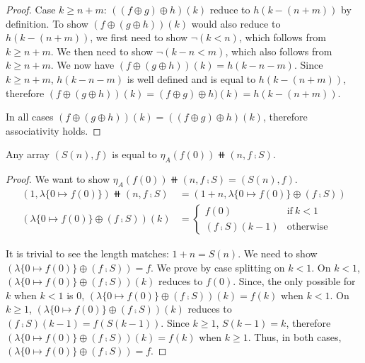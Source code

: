 \begin{proof}
    Case $k \geq n + m$: $((f \oplus g) \oplus h)(k)$ reduce to $h(k - (n + m))$ by definition.
    To show $(f \oplus (g \oplus h))(k)$ would also reduce to $h(k - (n + m))$,
    we first need to show $\neg(k < n)$, which follows from $k \geq n + m$.
    We then need to show $\neg(k - n < m)$, which also follows from $k \geq n + m$.
    We now have $(f \oplus (g \oplus h))(k) = h(k - n - m)$. Since $k \geq n + m$, $h(k - n - m)$ is well defined
    and is equal to $h(k - (n + m))$, therefore $(f \oplus (g \oplus h))(k) = (f \oplus g) \oplus h)(k) = h(k - (n + m))$.

    In all cases $(f \oplus (g \oplus h))(k) = ((f \oplus g) \oplus h)(k)$, therefore associativity holds.
\end{proof}

\begin{lemmarep}\label{array:eta-suc}
    Any array $(S(n), f)$ is equal to $\eta_A (f(0)) \doubleplus (n, f \comp S)$.
\end{lemmarep}

\begin{proof}
    We want to show $\eta_A (f(0)) \doubleplus (n, f \comp S) = (S(n), f)$.
    \begin{align*}
        (1, \lambda\{ 0 \mapsto f(0) \}) \doubleplus (n , f \comp S) &
        = (1 + n, \lambda\{ 0 \mapsto f(0) \} \oplus (f \comp S))                                              \\
        (\lambda\{ 0 \mapsto f(0) \} \oplus (f \comp S))(k)          & = \begin{cases}
                                                                             f(0)               & \text{if}\ k < 1 \\
                                                                             (f \comp S)(k - 1) & \text{otherwise}
                                                                         \end{cases}
    \end{align*}

    It is trivial to see the length matches: $1 + n = S(n)$. We need to show
    $(\lambda\{ 0 \mapsto f(0) \} \oplus (f \comp S)) = f$.
    We prove by case splitting on $k < 1$.
    On $k < 1$, $(\lambda\{ 0 \mapsto f(0) \} \oplus (f \comp S))(k)$ reduces to $f(0)$.
    Since, the only possible for $k$ when $k < 1$ is 0, $(\lambda\{ 0 \mapsto f(0) \} \oplus (f \comp S))(k) = f(k)$
    when $k < 1$.
    On $k \geq 1$, $(\lambda\{ 0 \mapsto f(0) \} \oplus (f \comp S))(k)$ reduces to $(f \comp S)(k - 1) = f(S(k - 1))$.
    Since $k \geq 1$, $S(k - 1) = k$, therefore $(\lambda\{ 0 \mapsto f(0) \} \oplus (f \comp S))(k) = f(k)$
    when $k \geq 1$.
    Thus, in both cases, $(\lambda\{ 0 \mapsto f(0) \} \oplus (f \comp S)) = f$.
\end{proof}

